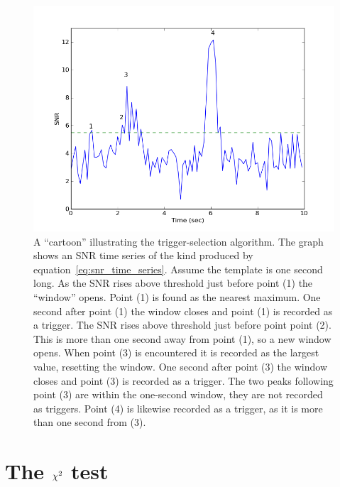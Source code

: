 \begin{figure}
  \includegraphics[width=\linewidth]{figures/search/snr_cartoon}
  \caption[The trigger-selection algorithm]{
  \label{f:snr_cartoon}
A ``cartoon'' illustrating the trigger-selection algorithm.  The graph
shows an SNR time series of the kind produced by
equation~\ref{eq:snr_time_series}.  Assume the template is one second
long.  As the SNR rises above threshold just before point (1) the
``window'' opens.  Point (1) is found as the nearest maximum.  One
second after point (1) the window closes and point (1) is 
recorded as a trigger.  The SNR rises above threshold just
before point point (2).  This is more than one second away from point
(1), so a new window opens.  When point (3) is encountered it is
recorded as the largest value, resetting the window.  One second after
point (3) the window closes and point (3) is recorded as a trigger.
The two peaks following point (3) are within the one-second window,
they are not recorded as triggers.  Point (4) is likewise recorded as
a trigger, as it is more than one second from (3).
}
\end{figure}%



\section{The $\chi^2$ test}
\label{sec:ihope_chisq}

